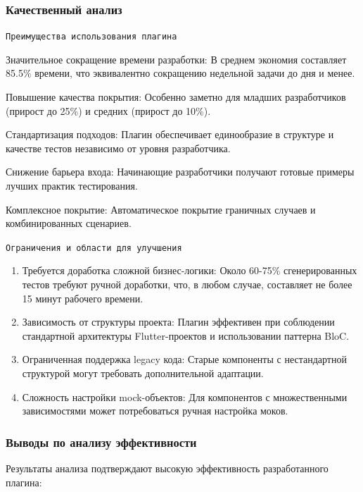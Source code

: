 \documentclass[14pt, russian]{scrartcl}
\begin{document}
\subsubsection{Качественный анализ}

\texttt{Преимущества использования плагина}

\begin{enumerate*}
    \item Значительное сокращение времени разработки: В среднем экономия составляет 85.5\% времени, что эквивалентно сокращению недельной задачи до дня и менее.
    \item Повышение качества покрытия: Особенно заметно для младших разработчиков (прирост до 25\%) и средних (прирост до 10\%).
    \item Стандартизация подходов: Плагин обеспечивает единообразие в структуре и качестве тестов независимо от уровня разработчика.
    \item Снижение барьера входа: Начинающие разработчики получают готовые примеры лучших практик тестирования.
    \item Комплексное покрытие: Автоматическое покрытие граничных случаев и комбинированных сценариев.
\end{enumerate*}

\texttt{Ограничения и области для улучшения}

\begin{enumerate}
    \item Требуется доработка сложной бизнес-логики: Около 60-75\% сгенерированных тестов требуют ручной доработки, что, в любом случае, составляет не более 15 минут рабочего времени.
    \item Зависимость от структуры проекта: Плагин эффективен при соблюдении стандартной архитектуры Flutter-проектов и использовании паттерна BloC.
    \item Ограниченная поддержка legacy кода: Старые компоненты с нестандартной структурой могут требовать дополнительной адаптации.
    \item Сложность настройки mock-объектов: Для компонентов с множественными зависимостями может потребоваться ручная настройка моков.
\end{enumerate}

\subsubsection{Выводы по анализу эффективности}

Результаты анализа подтверждают высокую эффективность разработанного плагина:
\end{document}
